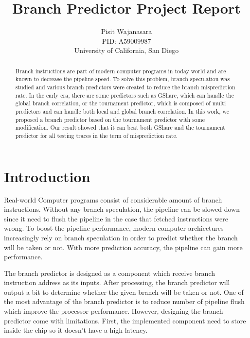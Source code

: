 \documentclass[conference]{IEEEtran}
\title{Branch Predictor Project Report}
\author{Pisit Wajanasara\\
PID: A59009987\\
University of California, San Diego}
\begin{document}
\maketitle
\thispagestyle{firstpage}
\pagestyle{plain}




\begin{abstract}

Branch instructions are part of modern computer programs in today world and are known to decrease
the pipeline speed. To solve this problem, branch speculation was studied and various branch predictors
were created to reduce the branch misprediction rate. In the early era, there are some predictors such as
GShare, which can handle the global branch correlation, or the tournament predictor, which is composed
of multi predictors and can handle both local and global branch correlation. In this work, we proposed
a branch predictor based on the tournament predictor with some modification. Our result showed that
it can beat both GShare and the tournament predictor for all testing traces in the term of misprediction rate.

\end{abstract}

\section{Introduction}

Real-world Computer programs consist of considerable amount of branch instructions. Without any branch speculation,
the pipeline can be slowed down since it need to flush the pipeline in the case that fetched instructions were wrong.
To boost the pipeline performance, modern computer archiectures increasingly rely on branch speculation in order
to predict whether the branch will be taken or not. With more prediction accuracy, the pipeline can gain more performance.

The branch predictor is designed as a component which receive branch instruction address as its inputs. After processing,
the branch predictor will output a bit to determine whether the given branch will be taken or not. One of the most
advantage of the branch predictor is to reduce number of pipeline flush which improve the processor performance. However,
designing the branch predictor come with limitations. First, the implemented component need to store inside the chip so it
doesn't have a high latency.
\end{document}

